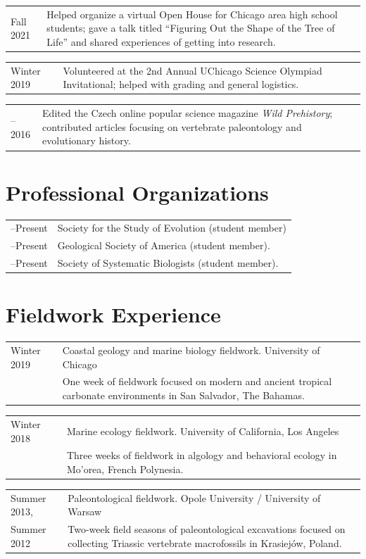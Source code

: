 \documentclass[10pt]{article}
\begin{document}
\begin{tabularx}{\textwidth}{>{\raggedleft\arraybackslash}p{2.2cm} X}
Fall 2021 & Helped organize a virtual Open House for Chicago area high school students; gave a talk titled ``Figuring Out the Shape of the Tree of Life'' and shared experiences of getting into research.
\end{tabularx}
\begin{tabularx}{\textwidth}{>{\raggedleft\arraybackslash}p{2.2cm} X}
Winter 2019 & Volunteered at the 2nd Annual UChicago Science Olympiad Invitational; helped with grading and general logistics.
\end{tabularx}
\begin{tabularx}{\textwidth}{>{\raggedleft\arraybackslash}p{2.2cm} X}
2015--2016 & Edited the Czech online popular science magazine \textit{Wild Prehistory}; contributed articles focusing on vertebrate paleontology and evolutionary history.
\end{tabularx}

\section*{Professional Organizations}

\begin{tabularx}{\textwidth}{>{\raggedleft\arraybackslash}p{2.2cm} X}
2023--Present & Society for the Study of Evolution (student member) \\[0.1cm]
2022--Present & Geological Society of America (student member). \\[0.1cm]
2017--Present & Society of Systematic Biologists (student member).
\end{tabularx}

\section*{Fieldwork Experience}

\begin{tabularx}{\textwidth}{>{\raggedleft\arraybackslash}p{2.2cm} X}
Winter 2019 & Coastal geology and marine biology fieldwork. University of Chicago \\
& One week of fieldwork focused on modern and ancient tropical carbonate environments in San Salvador, The Bahamas.
\end{tabularx}
\begin{tabularx}{\textwidth}{>{\raggedleft\arraybackslash}p{2.2cm} X}
Winter 2018 & Marine ecology fieldwork. University of California, Los Angeles \\
& Three weeks of fieldwork in algology and behavioral ecology in Mo'orea, French Polynesia.
\end{tabularx}
\begin{tabularx}{\textwidth}{>{\raggedleft\arraybackslash}p{2.2cm} X}
Summer 2013, & Paleontological fieldwork. Opole University / University of Warsaw \\
Summer 2012 & Two-week field seasons of paleontological excavations focused on collecting Triassic vertebrate macrofossils in Krasiej\'{o}w, Poland.
\end{tabularx}
\end{document}
